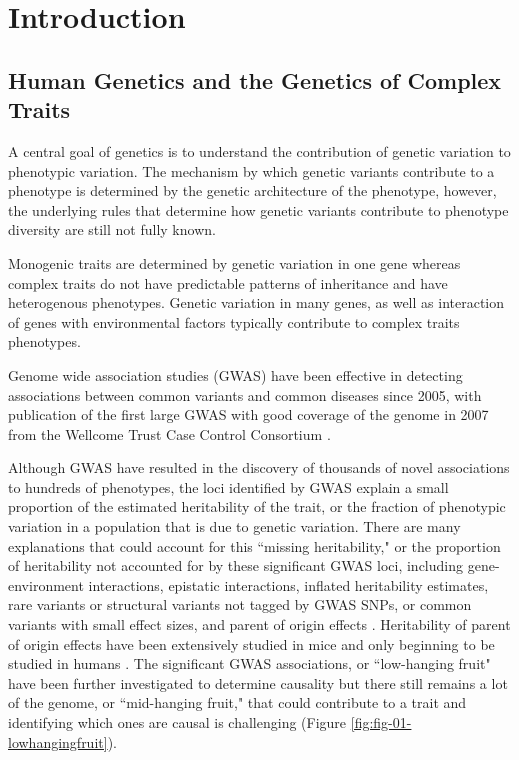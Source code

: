 
\chapter{Introduction}

\section{Human Genetics and the Genetics of Complex Traits}

A central goal of genetics is to understand the contribution of genetic variation to phenotypic variation. The mechanism by which genetic variants contribute to a phenotype is determined by the genetic architecture of the phenotype, however, the underlying rules that determine how genetic variants contribute to phenotype diversity are still not fully known. 

Monogenic traits are determined by genetic variation in one gene whereas complex traits do not have predictable patterns of inheritance and have heterogenous phenotypes. Genetic variation in many genes, as well as interaction of genes with environmental factors typically contribute to complex traits phenotypes. 

Genome wide association studies (GWAS) have been effective in detecting associations between common variants and common diseases since 2005, with publication of the first large GWAS with good coverage of the genome in 2007 from the Wellcome Trust Case Control Consortium \cite{WellcomeTrustCaseControlConsortium:2007do}. 

Although GWAS have resulted in the discovery of thousands of novel associations to hundreds of phenotypes, the loci identified by GWAS explain a small proportion of the estimated heritability of the trait, or the fraction of phenotypic variation in a population that is due to genetic variation. There are many explanations that could account for this ``missing heritability," or the proportion of heritability not accounted for by these significant GWAS loci, including gene-environment interactions, epistatic interactions, inflated heritability estimates, rare variants or structural variants not tagged by GWAS SNPs, or common variants with small effect sizes, and parent of origin effects \cite{Zaitlen2013,Eichler:2010kd,Gibson:2012kc,Zuk:cc}. Heritability of parent of origin effects have been extensively studied in mice \cite{Babak2008,Mott2014,Babak2015,Babak2012} and only beginning to be studied in humans \cite{Laurin:2017jv}. The significant GWAS associations, or ``low-hanging fruit" have been further investigated to determine causality but there still remains a lot of the genome, or ``mid-hanging fruit," that could contribute to a trait and identifying which ones are causal is challenging (Figure \ref{fig:fig-01-lowhangingfruit}).

